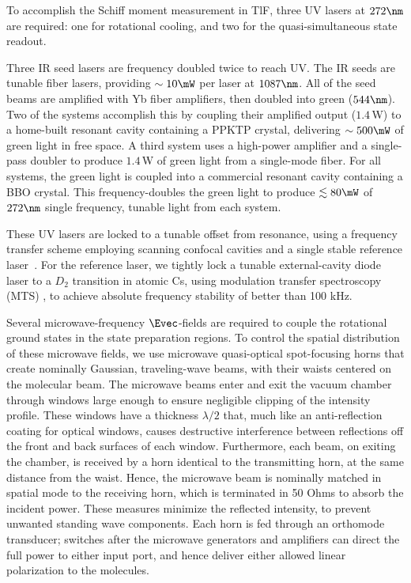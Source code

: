 To accomplish the Schiff moment measurement in TlF, three UV lasers at $272\nm$ are required:  one for rotational cooling, and two for the quasi-simultaneous state readout.

Three IR seed lasers are frequency doubled twice to reach UV.  The IR seeds are tunable fiber lasers, providing $\sim10\mW$ per laser at $1087\nm$.  All of the seed beams are amplified with Yb fiber amplifiers, then doubled into green ($544\nm$). Two of the systems accomplish this by coupling their amplified output ($1.4\,$W) to a home-built resonant cavity containing a PPKTP crystal, delivering $\sim 500\mW$ of green light in free space.  A third system uses a high-power amplifier and a single-pass doubler to produce $1.4\,$W of green light from a single-mode fiber. For all systems, the green light is coupled into a commercial resonant cavity containing a BBO crystal. This frequency-doubles the green light to produce $\lesssim 80\mW$ of $272\nm$ single frequency, tunable light from each system.

These UV lasers are locked to a tunable offset from resonance, using a frequency transfer scheme employing scanning confocal cavities and a single stable reference laser~\cite{lindsay1991scanningcavity,jaffe1993scanningcavity,zhao1998scanningcavity,rossi2002scanningcavity}.  For the reference laser, we tightly lock a tunable external-cavity diode laser to a $D_2$ transition in atomic Cs, using modulation transfer spectroscopy (MTS) \cite{zi2017laser}, to achieve absolute frequency stability of better than 100 kHz.

Several microwave-frequency $\Evec$-fields are required to couple the rotational ground states in the state preparation regions. To control the spatial distribution of these microwave fields, we use microwave quasi-optical spot-focusing horns that create nominally Gaussian, traveling-wave beams, with their waists centered on the molecular beam.  The microwave beams enter and exit the vacuum chamber through windows large enough to ensure negligible clipping of the intensity profile. These windows have a thickness $\lambda/2$ that, much like an anti-reflection coating for optical windows, causes destructive interference between reflections off the front and back surfaces of each window. Furthermore, each beam, on exiting the chamber, is received by a horn identical to the transmitting horn, at the same distance from the waist. Hence, the microwave beam is nominally matched in spatial mode to the receiving horn, which is terminated in 50 Ohms to absorb the incident power. These measures minimize the reflected intensity, to prevent unwanted standing wave components. Each horn is fed through an orthomode transducer; switches after the microwave generators and amplifiers can direct the full power to either input port, and hence deliver either allowed linear polarization to the molecules.

